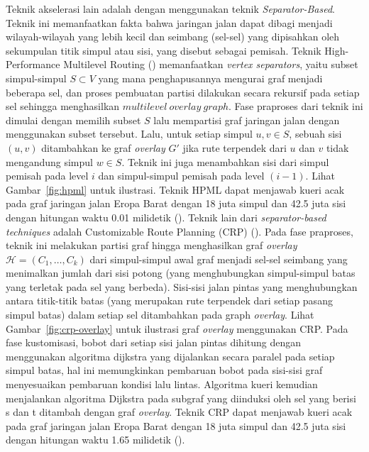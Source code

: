 Teknik akselerasi lain adalah dengan menggunakan teknik \textit{Separator-Based}. Teknik ini memanfaatkan fakta bahwa jaringan jalan dapat dibagi menjadi wilayah-wilayah yang lebih kecil dan seimbang (sel-sel) yang dipisahkan oleh sekumpulan titik simpul atau sisi, yang disebut sebagai pemisah. Teknik High-Performance Multilevel Routing (\cite{DellingHPML}) memanfaatkan \textit{vertex separators}, yaitu subset simpul-simpul $S\subset V$ yang mana penghapusannya mengurai graf menjadi beberapa sel, dan proses pembuatan partisi dilakukan secara rekursif pada setiap sel sehingga menghasilkan $multilevel \ overlay \ graph$. Fase praproses dari teknik ini dimulai dengan memilih subset $S$ lalu mempartisi graf jaringan jalan dengan menggunakan subset tersebut. Lalu, untuk setiap simpul $u,v\in S$, sebuah sisi $(u,v)$ ditambahkan ke graf \textit{overlay} $G'$ jika rute terpendek dari $u$ dan $v$ tidak mengandung simpul $w\in S$. Teknik ini juga menambahkan sisi dari simpul pemisah pada level $i$ dan simpul-simpul pemisah pada level $(i-1)$. Lihat Gambar~\ref{fig:hpml} untuk ilustrasi. Teknik HPML  dapat menjawab kueri acak pada graf jaringan jalan Eropa Barat dengan 18 juta simpul dan 42.5 juta sisi dengan hitungan waktu 0.01 milidetik (\cite{Bast2015}). Teknik lain dari \textit{separator-based techniques} adalah Customizable Route Planning (CRP) (\cite{Delling2015}). Pada fase praproses, teknik ini melakukan partisi graf hingga menghasilkan graf \textit{overlay} $\mathcal{H}=(C_1,\ldots,C_k)$ dari simpul-simpul awal graf menjadi sel-sel seimbang yang menimalkan jumlah dari sisi potong (yang menghubungkan simpul-simpul batas yang terletak pada sel yang berbeda). Sisi-sisi jalan pintas yang menghubungkan antara titik-titik batas (yang merupakan rute terpendek dari setiap pasang simpul batas) dalam setiap sel ditambahkan pada graph \textit{overlay}. Lihat Gambar~\ref{fig:crp-overlay} untuk ilustrasi graf \textit{overlay} menggunakan CRP. Pada fase kustomisasi, bobot dari setiap sisi jalan pintas dihitung dengan menggunakan algoritma dijkstra yang dijalankan secara paralel pada setiap simpul batas, hal ini memungkinkan pembaruan bobot pada sisi-sisi graf menyesuaikan pembaruan kondisi lalu lintas. Algoritma kueri kemudian menjalankan algoritma Dijkstra pada subgraf yang diinduksi oleh sel yang berisi s dan t ditambah dengan graf \textit{overlay}. Teknik CRP  dapat menjawab kueri acak pada graf jaringan jalan Eropa Barat dengan 18 juta simpul dan 42.5 juta sisi dengan hitungan waktu 1.65 milidetik (\cite{Delling2015}).


